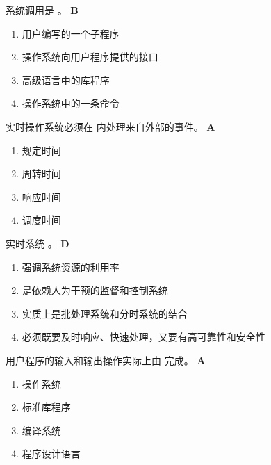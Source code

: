 \begin{problem}
	系统调用是 \myline。
	\textbf{B}
	\vspace{-0.5em}
	\begin{multicols}{2}
		\begin{enumerate}[label=\Alph*.]
			\item 用户编写的一个子程序
			\item 操作系统向用户程序提供的接口
			\item 高级语言中的库程序
			\item 操作系统中的一条命令
		\end{enumerate}
	\end{multicols}
	\vspace{-1em}
\end{problem}


\begin{problem}
	‍实时操作系统必须在 \myline 内处理来自外部的事件。
	\textbf{A}
	\vspace{-0.5em}
	\begin{multicols}{4}
		\begin{enumerate}[label=\Alph*.]
			\item 规定时间
			\item 周转时间
			\item 响应时间
			\item 调度时间
		\end{enumerate}
	\end{multicols}
	\vspace{-1em}
\end{problem}


\begin{problem}
	‍‍实时系统 \myline 。
	\textbf{D}
		\begin{enumerate}[label=\Alph*.]
			\item 强调系统资源的利用率
			\item 是依赖人为干预的监督和控制系统
			\item 实质上是批处理系统和分时系统的结合
			\item 必须既要及时响应、快速处理，又要有高可靠性和安全性
		\end{enumerate}
\end{problem}


\begin{problem}
	‍用户程序的输入和输出操作实际上由 \myline 完成。
	\textbf{A}
	\vspace{-0.5em}
	\begin{multicols}{4}
		\begin{enumerate}[label=\Alph*.]
			\item 操作系统
			\item 标准库程序
			\item 编译系统
			\item 程序设计语言
		\end{enumerate}
	\end{multicols}
	\vspace{-1em}
\end{problem}


